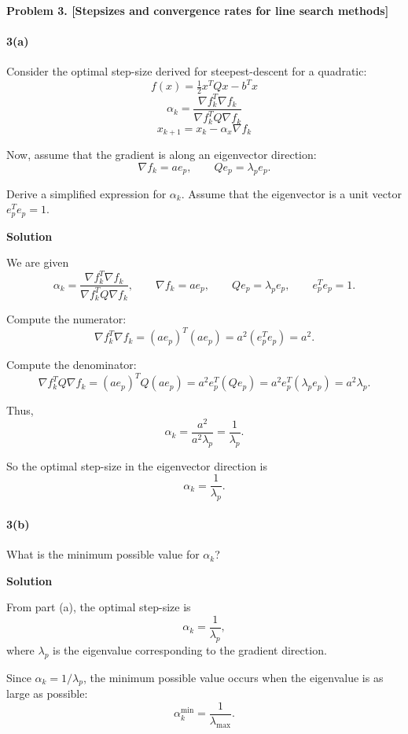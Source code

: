 \documentclass[11pt]{article}
\begin{document}
	\newpage
	
	\noindent\textbf{Problem 3. [Stepsizes and convergence rates for line search methods]}
	
	\paragraph{3(a)} Consider the optimal step-size derived for steepest-descent for a quadratic:
	\[
	f(x) = \tfrac{1}{2} x^T Q x - b^T x
	\]
	\[
	\alpha_k = \frac{\nabla f_k^T \nabla f_k}{\nabla f_k^T Q \nabla f_k}
	\]
	\[
	x_{k+1} = x_k - \alpha_x \nabla f_k
	\]
	
	Now, assume that the gradient is along an eigenvector direction:
	\[
	\nabla f_k = a e_p, \qquad Q e_p = \lambda_p e_p.
	\]
	
	Derive a simplified expression for $\alpha_k$. Assume that the eigenvector is a unit vector $e_p^T e_p = 1$.
	
	\noindent\textbf{Solution}
	
	We are given
	\[
	\alpha_k = 
	\frac{\nabla f_k^T \nabla f_k}{\nabla f_k^T Q \nabla f_k},
	\qquad
	\nabla f_k = a e_p,
	\qquad
	Q e_p = \lambda_p e_p,
	\qquad
	e_p^T e_p = 1.
	\]
	
	Compute the numerator:
	\[
	\nabla f_k^T \nabla f_k
	= (a e_p)^T (a e_p)
	= a^2 (e_p^T e_p)
	= a^2.
	\]
	
	Compute the denominator:
	\[
	\nabla f_k^T Q \nabla f_k
	= (a e_p)^T Q (a e_p)
	= a^2 e_p^T (Q e_p)
	= a^2 e_p^T (\lambda_p e_p)
	= a^2 \lambda_p.
	\]
	
	Thus,
	\[
	\alpha_k
	= \frac{a^2}{a^2 \lambda_p}
	= \frac{1}{\lambda_p}.
	\]
	
	So the optimal step-size in the eigenvector direction is
	\[
	\alpha_k = \frac{1}{\lambda_p}.
	\]
	
	\paragraph{3(b)} What is the minimum possible value for $\alpha_k$?
	
	\noindent\textbf{Solution}
	
	From part (a), the optimal step-size is
	\[
	\alpha_k = \frac{1}{\lambda_p},
	\]
	where $\lambda_p$ is the eigenvalue corresponding to the gradient direction.
	
	Since $\alpha_k = 1/\lambda_p$, the minimum possible value occurs when the eigenvalue is as large as possible:
	\[
	\alpha_k^{\min} = \frac{1}{\lambda_{\max}}.
	\]
	
\end{document}
